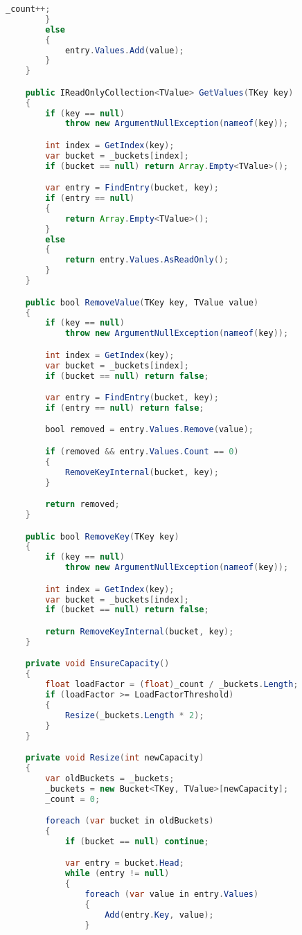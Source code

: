 \documentclass[12pt]{article}
\begin{document}
\begin{lstlisting}[language=Java]
            _count++;
        }
        else
        {
            entry.Values.Add(value);
        }
    }

    public IReadOnlyCollection<TValue> GetValues(TKey key)
    {
        if (key == null)
            throw new ArgumentNullException(nameof(key));

        int index = GetIndex(key);
        var bucket = _buckets[index];
        if (bucket == null) return Array.Empty<TValue>();

        var entry = FindEntry(bucket, key);
        if (entry == null)
        {
            return Array.Empty<TValue>();
        }
        else
        {
            return entry.Values.AsReadOnly();
        }
    }

    public bool RemoveValue(TKey key, TValue value)
    {
        if (key == null)
            throw new ArgumentNullException(nameof(key));

        int index = GetIndex(key);
        var bucket = _buckets[index];
        if (bucket == null) return false;

        var entry = FindEntry(bucket, key);
        if (entry == null) return false;

        bool removed = entry.Values.Remove(value);

        if (removed && entry.Values.Count == 0)
        {
            RemoveKeyInternal(bucket, key);
        }

        return removed;
    }

    public bool RemoveKey(TKey key)
    {
        if (key == null)
            throw new ArgumentNullException(nameof(key));

        int index = GetIndex(key);
        var bucket = _buckets[index];
        if (bucket == null) return false;

        return RemoveKeyInternal(bucket, key);
    }

    private void EnsureCapacity()
    {
        float loadFactor = (float)_count / _buckets.Length;
        if (loadFactor >= LoadFactorThreshold)
        {
            Resize(_buckets.Length * 2);
        }
    }

    private void Resize(int newCapacity)
    {
        var oldBuckets = _buckets;
        _buckets = new Bucket<TKey, TValue>[newCapacity];
        _count = 0;

        foreach (var bucket in oldBuckets)
        {
            if (bucket == null) continue;

            var entry = bucket.Head;
            while (entry != null)
            {
                foreach (var value in entry.Values)
                {
                    Add(entry.Key, value);
                }


\end{lstlisting}
\end{document}
